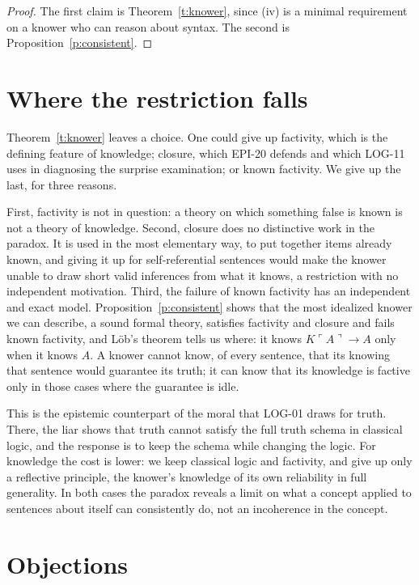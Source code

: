 \documentclass{situationist-preprint}
\begin{document}
\begin{proof}
The first claim is Theorem~\ref{t:knower}, since (iv) is a minimal requirement on a knower who can reason about syntax. The second is Proposition~\ref{p:consistent}.
\end{proof}

\section{Where the restriction falls}

Theorem~\ref{t:knower} leaves a choice. One could give up factivity, which is the defining feature of knowledge; closure, which EPI-20 defends and which LOG-11 uses in diagnosing the surprise examination; or known factivity. We give up the last, for three reasons.

First, factivity is not in question: a theory on which something false is known is not a theory of knowledge. Second, closure does no distinctive work in the paradox. It is used in the most elementary way, to put together items already known, and giving it up for self-referential sentences would make the knower unable to draw short valid inferences from what it knows, a restriction with no independent motivation. Third, the failure of known factivity has an independent and exact model. Proposition~\ref{p:consistent} shows that the most idealized knower we can describe, a sound formal theory, satisfies factivity and closure and fails known factivity, and Löb's theorem tells us where: it knows $K\ulcorner A\urcorner \rightarrow A$ only when it knows $A$. A knower cannot know, of every sentence, that its knowing that sentence would guarantee its truth; it can know that its knowledge is factive only in those cases where the guarantee is idle.

This is the epistemic counterpart of the moral that LOG-01 draws for truth. There, the liar shows that truth cannot satisfy the full truth schema in classical logic, and the response is to keep the schema while changing the logic. For knowledge the cost is lower: we keep classical logic and factivity, and give up only a reflective principle, the knower's knowledge of its own reliability in full generality. In both cases the paradox reveals a limit on what a concept applied to sentences about itself can consistently do, not an incoherence in the concept.

\section{Objections}
\end{document}
